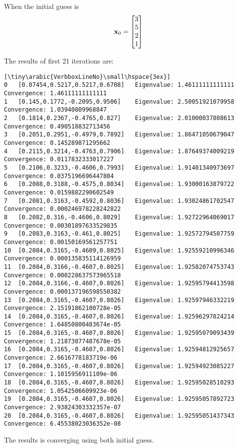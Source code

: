\documentclass{article}
\begin{document}
\begin{enumerate}
When the initial guess is 
\begin{align}
\boldsymbol{\mathrm{x}}_0=\begin{bmatrix} 3 \\ 5 \\ 2\\ 1 \end{bmatrix}
\end{align}

The results of first 21 iterations are: 
\begin{verbatim}[\tiny\arabic{VerbboxLineNo}\small\hspace{3ex}]
0	[0.07454,0.5217,0.5217,0.6708]	 Eigenvalue: 1.46111111111111	 Convergence: 1.46111111111111
1	[0.145,0.1772,-0.2095,0.9506]	 Eigenvalue: 2.50051921079958	 Convergence: 1.03940809968847
2	[0.1814,0.2367,-0.4765,0.827]	 Eigenvalue: 2.01000037808613	 Convergence: 0.490518832713456
3	[0.2051,0.2951,-0.4979,0.7892]	 Eigenvalue: 1.86471050679047	 Convergence: 0.145289871295662
4	[0.2115,0.3214,-0.4763,0.7906]	 Eigenvalue: 1.87649374009219	 Convergence: 0.0117832333017227
5	[0.2106,0.3233,-0.4606,0.7993]	 Eigenvalue: 1.91401340973697	 Convergence: 0.0375196696447804
6	[0.2088,0.3188,-0.4575,0.8034]	 Eigenvalue: 1.93000163879722	 Convergence: 0.0159882290602549
7	[0.2081,0.3163,-0.4592,0.8036]	 Eigenvalue: 1.93024861702547	 Convergence: 0.000246978228242822
8	[0.2082,0.316,-0.4606,0.8029]	 Eigenvalue: 1.92722964069017	 Convergence: 0.00301897633529835
9	[0.2083,0.3163,-0.461,0.8025]	 Eigenvalue: 1.92572794507759	 Convergence: 0.00150169561257751
10	[0.2084,0.3165,-0.4609,0.8025]	 Eigenvalue: 1.92559210996346	 Convergence: 0.000135835114126959
11	[0.2084,0.3166,-0.4607,0.8025]	 Eigenvalue: 1.92582074753743	 Convergence: 0.000228637573965518
12	[0.2084,0.3166,-0.4607,0.8026]	 Eigenvalue: 1.92595794413598	 Convergence: 0.000137196598550382
13	[0.2084,0.3165,-0.4607,0.8026]	 Eigenvalue: 1.92597946332219	 Convergence: 2.15191862100728e-05
14	[0.2084,0.3165,-0.4607,0.8026]	 Eigenvalue: 1.92596297824214	 Convergence: 1.64850800483674e-05
15	[0.2084,0.3165,-0.4607,0.8026]	 Eigenvalue: 1.92595079093439	 Convergence: 1.21873077487678e-05
16	[0.2084,0.3165,-0.4607,0.8026]	 Eigenvalue: 1.92594812925657	 Convergence: 2.6616778183719e-06
17	[0.2084,0.3165,-0.4607,0.8026]	 Eigenvalue: 1.92594923085227	 Convergence: 1.1015956911109e-06
18	[0.2084,0.3165,-0.4607,0.8026]	 Eigenvalue: 1.92595028510293	 Convergence: 1.0542506609923e-06
19	[0.2084,0.3165,-0.4607,0.8026]	 Eigenvalue: 1.92595057892723	 Convergence: 2.93824303332357e-07
20	[0.2084,0.3165,-0.4607,0.8026]	 Eigenvalue: 1.92595051437343	 Convergence: 6.45538023036352e-08
\end{verbatim}
The results is converging using both initial guess. 


\end{enumerate}
\end{document}
